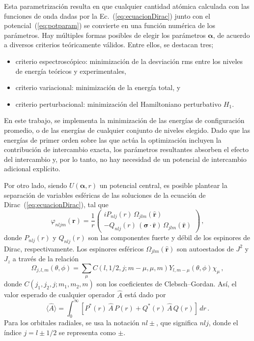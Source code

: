 Esta parametrización resulta en que cualquier cantidad atómica calculada 
con las funciones de onda dadas por la Ec.~(\ref{eq:ecuacionDirac}) 
junto con el potencial~(\ref{eq:potparam}) se convierte en una función 
numérica de los parámetros. Hay múltiples formas posibles de elegir los 
parámetros $\boldsymbol{\alpha}$, de acuerdo a diversos criterios 
teóricamente válidos. Entre ellos, se destacan tres;
\begin{itemize}
\item criterio espectroscópico: minimización de la desviación \acs{rms} 
entre los niveles de energía teóricos y experimentales,
\item criterio variacional: minimización de la energía total, y
\item criterio perturbacional: minimización del Hamiltoniano perturbativo
$H_1$. 
\end{itemize}
En este trabajo, se implementa la minimización de las energías de 
configuración promedio, o de las energías de cualquier conjunto de 
niveles elegido. Dado que las energías de primer orden sobre las que 
actúa la optimización incluyen la contribución de intercambio exacta, 
los parámetros resultantes absorben el efecto del intercambio y, por lo 
tanto, no hay necesidad de un potencial de intercambio adicional 
explícito.

Por otro lado, siendo $U(\boldsymbol{\alpha},r)$ un potencial central,
es posible plantear la separación de variables esféricas de las 
soluciones de la ecuación de Dirac~(\ref{eq:ecuacionDirac}), tal que
\begin{equation}
\varphi_{nljm}(\mathbf{r}) = \frac{1}{r} \left( 
\begin{array}{c}
i P_{nlj}(r) \,\Omega_{jlm}(\hat{\mathbf{r}}) \\ 
- Q_{nlj}(r) \,(\boldsymbol{\sigma}\cdot\hat{\mathbf{r}})\,
\Omega_{jlm}(\hat{\mathbf{r}})
\end{array}
\right)\,,
\label{eq:sepespinor}
\end{equation}
donde $P_{nlj}(r)$ y $Q_{nlj}(r)$ son las componentes fuerte y débil de 
los espinores de Dirac, respectivamente. Los espinores esféricos 
$\Omega_{jlm}(\hat{\mathbf{r}})$ son autoestados de $J^2$ y $J_z$ a 
través de la relación
\begin{equation}
\Omega_{j,l,m}(\theta,\phi)=\sum_{\mu} C(l,1/2,j;m-\mu,\mu,m) 
Y_{l,m-\mu}(\theta,\phi)\chi_{\mu}\,,
\end{equation}
donde $C\left(j_1,j_2,j;m_1,m_2,m\right)$ son los coeficientes de 
Clebsch--Gordan. Así, el valor esperado de cualquier operador $\hat{A}$ 
está dado por
\begin{equation}
\langle\hat{A}\rangle=\int_0^{\infty}\left[P^*(r)\,\hat{A}\,P(r) 
 +Q^*(r)\,\hat{A}\,Q(r)
\right]\,dr\,.
\label{eq:meanvalr}
\end{equation}
Para los orbitales radiales, se usa la notación $nl\pm$, que significa 
$nlj$, donde el índice $j=l\pm1/2$ se representa como $\pm$.

